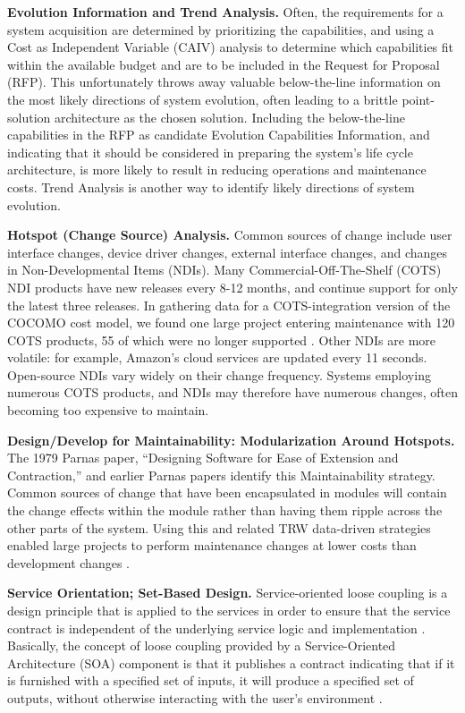 \textbf{Evolution Information and Trend Analysis.}
Often, the requirements for a system acquisition are determined by prioritizing the capabilities, and using a Cost as Independent Variable (CAIV) analysis to determine which capabilities fit within the available budget and are to be included in the Request for Proposal (RFP).   This unfortunately throws away valuable below-the-line information on the most likely directions of system evolution, often leading to a brittle point-solution architecture as the chosen solution.
Including the below-the-line capabilities in the RFP as candidate Evolution Capabilities Information, and indicating that it should be considered in preparing the system's life cycle architecture, is more likely to result in reducing operations and maintenance costs.
Trend Analysis is another way to identify likely directions of system evolution.

\textbf{Hotspot (Change Source) Analysis.} Common sources of change include user interface changes, device driver changes, external interface changes, and changes in Non-Developmental Items (NDIs).
Many Commercial-Off-The-Shelf (COTS) NDI products have new releases every 8-12 months, and continue support for only the latest three releases.  In gathering data for a COTS-integration version of the COCOMO cost model, we found one large project entering maintenance with 120 COTS products, 55 of which were no longer supported \cite{Abts00cocots:a}.  Other NDIs are more volatile: for example, Amazon's cloud services are updated every 11 seconds.  Open-source NDIs vary widely on their change frequency.  Systems employing numerous COTS products, and NDIs may therefore have numerous changes, often becoming too expensive to maintain.

\textbf{Design/Develop for Maintainability: Modularization Around Hotspots.} The 1979 Parnas paper, ``Designing Software for Ease of Extension and Contraction,'' \cite{parnas1979designing} and earlier Parnas papers identify this Maintainability strategy.   Common sources of change that have been encapsulated in modules will contain the change effects within the module rather than having them ripple across the other parts of the system.    Using this and related TRW data-driven strategies enabled large projects to perform maintenance changes at lower costs than development changes \cite{royce1998software}.   

\textbf{Service Orientation; Set-Based Design.} Service-oriented loose coupling is a design principle that is applied to the services in order to ensure that the service contract is independent of the underlying service logic and implementation \cite{sundbo2000innovation}. Basically, the concept of loose coupling provided by a Service-Oriented Architecture (SOA) component is that it publishes a contract indicating that if it is furnished with a specified set of inputs, it will produce a specified set of outputs, without otherwise interacting with the user's environment \cite{boehm2008balancing,borges2004delving}.

